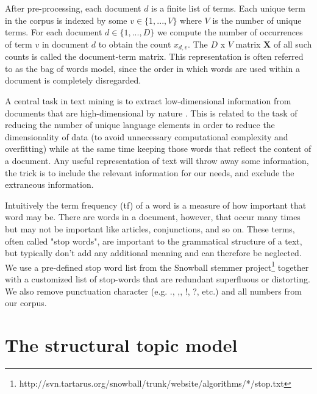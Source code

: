 \documentclass[12pt,a4paper,notitlepage]{article}
\begin{document}
After pre-processing, each document $d$ is a finite list of terms. Each unique term in the corpus is indexed by some $v \in \lbrace 1,...,V \rbrace$ where $V$ is the number of unique terms. For each document $d \in \lbrace 1,...,D \rbrace$ we compute the number of occurrences of term $v$ in document $d$ to obtain the count $x_{d,v}$. The $D$ x $V$ matrix $\boldsymbol{X}$ of all such counts is called the document-term matrix. This representation is often referred to as the bag of words model, since the order in which words are used within a document is completely disregarded. 

A central task in text mining is to extract low-dimensional information from documents that are high-dimensional by nature \citep{bholat_text_2015}. This is related to the task of reducing the number of unique language elements in order to reduce the dimensionality of data (to avoid unnecessary computational complexity and overfitting) while at the same time keeping those words that reflect the content of a document. Any useful representation of text will throw away some information, the trick is to include the relevant information for our needs, and exclude the extraneous information. 

Intuitively the term frequency (tf) of a word is a measure of how important that word may be. There are words in a document, however, that occur many times but may not be important like articles, conjunctions, and so on. These terms, often called "stop words", are important to the grammatical structure of a text, but typically don't add any additional meaning and can therefore be neglected. We use a pre-defined stop word list from the Snowball stemmer project\footnote{http://svn.tartarus.org/snowball/trunk/website/algorithms/*/stop.txt} together with a customized list of stop-words that are redundant superfluous or distorting. We also remove punctuation character (e.g. ., ,, !, ?, etc.) and all numbers from our corpus.  

\section{The structural topic model}\label{ch_model}
\end{document}
